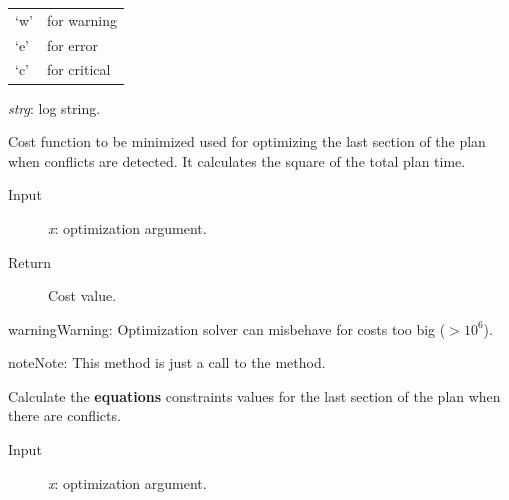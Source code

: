 \documentclass[letterpaper,10pt,english]{sphinxmanual}
\begin{document}
\begin{fulllineitems}
\begin{fulllineitems}
\begin{description}
\begin{description}
\begin{tabulary}{\linewidth}{|L|L|}
`w'
 & 
for warning
\\

`e'
 & 
for error
\\

`c'
 & 
for critical
\\
\hline\end{tabulary}


\end{description}

\emph{strg}: log string.

\end{description}

\end{fulllineitems}


\begin{fulllineitems}
\label{Multi-robot motion planner:planning_sim.Robot._ls_co_criterion}
Cost function to be minimized used for optimizing
the last section of the plan when conflicts are detected.
It calculates the square of the total plan time.
\begin{description}
\item[{Input}] \leavevmode
\emph{x}: optimization argument.

\item[{Return}] \leavevmode
Cost value.

\end{description}

\begin{notice}{warning}{Warning:}
Optimization solver can misbehave for costs too big (\(> 10^{6}\)).
\end{notice}

\begin{notice}{note}{Note:}
This method is just a call to the {\hyperref[Multi-robot motion planner:planning_sim.Robot._ls_sa_criterion]{}} method.
\end{notice}

\end{fulllineitems}


\begin{fulllineitems}
\label{Multi-robot motion planner:planning_sim.Robot._ls_co_feqcons}
Calculate the \textbf{equations} constraints values for the last section of the plan when
there are conflicts.
\begin{description}
\item[{Input}] \leavevmode
\emph{x}: optimization argument.


\end{description}
\end{fulllineitems}
\end{fulllineitems}
\end{document}
